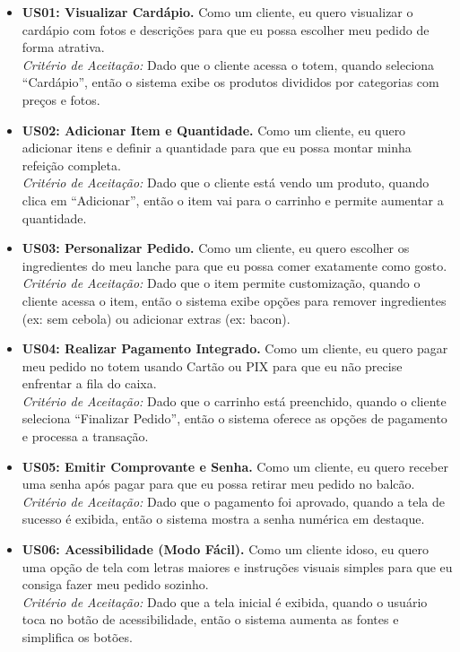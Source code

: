 \documentclass[12pt, oneside, a4paper, chapter=TITLE,section=TITLE]{abntex2}
\begin{document}
\begin{itemize}
    \item \textbf{US01: Visualizar Cardápio.} Como um cliente, eu quero visualizar o cardápio com fotos e descrições para que eu possa escolher meu pedido de forma atrativa. \\
    \textit{Critério de Aceitação:} Dado que o cliente acessa o totem, quando seleciona ``Cardápio'', então o sistema exibe os produtos divididos por categorias com preços e fotos.

    \item \textbf{US02: Adicionar Item e Quantidade.} Como um cliente, eu quero adicionar itens e definir a quantidade para que eu possa montar minha refeição completa. \\
    \textit{Critério de Aceitação:} Dado que o cliente está vendo um produto, quando clica em ``Adicionar'', então o item vai para o carrinho e permite aumentar a quantidade.

    \item \textbf{US03: Personalizar Pedido.} Como um cliente, eu quero escolher os ingredientes do meu lanche para que eu possa comer exatamente como gosto. \\
    \textit{Critério de Aceitação:} Dado que o item permite customização, quando o cliente acessa o item, então o sistema exibe opções para remover ingredientes (ex: sem cebola) ou adicionar extras (ex: bacon).

    \item \textbf{US04: Realizar Pagamento Integrado.} Como um cliente, eu quero pagar meu pedido no totem usando Cartão ou PIX para que eu não precise enfrentar a fila do caixa. \\
    \textit{Critério de Aceitação:} Dado que o carrinho está preenchido, quando o cliente seleciona ``Finalizar Pedido'', então o sistema oferece as opções de pagamento e processa a transação.

    \item \textbf{US05: Emitir Comprovante e Senha.} Como um cliente, eu quero receber uma senha após pagar para que eu possa retirar meu pedido no balcão. \\
    \textit{Critério de Aceitação:} Dado que o pagamento foi aprovado, quando a tela de sucesso é exibida, então o sistema mostra a senha numérica em destaque.

    \item \textbf{US06: Acessibilidade (Modo Fácil).} Como um cliente idoso, eu quero uma opção de tela com letras maiores e instruções visuais simples para que eu consiga fazer meu pedido sozinho. \\
    \textit{Critério de Aceitação:} Dado que a tela inicial é exibida, quando o usuário toca no botão de acessibilidade, então o sistema aumenta as fontes e simplifica os botões.


\end{itemize}
\end{document}
